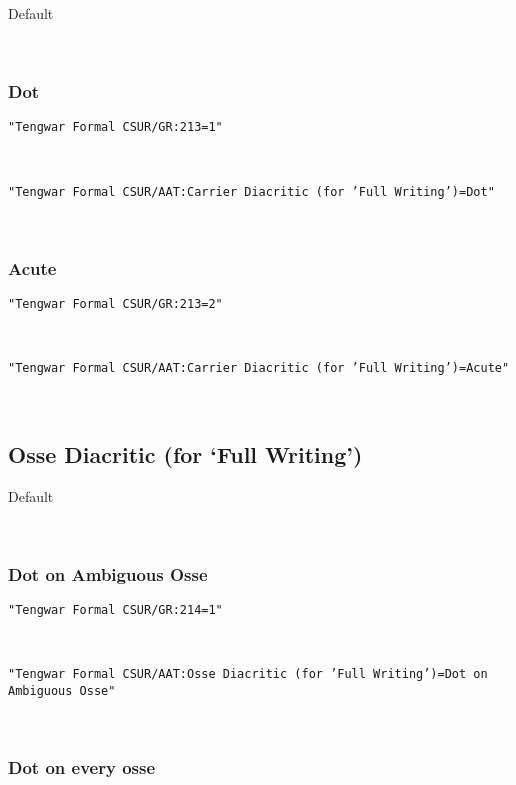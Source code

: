 \documentclass[11pt,a4paper]{article}
\begin{document}
Default

\formalGR  



\subsubsection*{Dot}


\texttt{"Tengwar Formal CSUR/GR:213=1"}

\formalGRcarrierdot  

\noindent \texttt{"Tengwar Formal CSUR/AAT:Carrier Diacritic (for 'Full Writing')=Dot"}

\formalAATcarrierdot   



\subsubsection*{Acute}


\texttt{"Tengwar Formal CSUR/GR:213=2"}

\formalGRcarrieracute  

\noindent \texttt{"Tengwar Formal CSUR/AAT:Carrier Diacritic (for 'Full Writing')=Acute"}

\formalAATcarrieracute   \normalfont



\subsection{Osse Diacritic (for ‘Full Writing’)}


Default

\formalGR  



\subsubsection*{Dot on Ambiguous Osse}


\texttt{"Tengwar Formal CSUR/GR:214=1"}

\formalGRosseambiguous  

\noindent \texttt{"Tengwar Formal CSUR/AAT:Osse Diacritic (for 'Full Writing')=Dot on Ambiguous Osse"}

\formalAATosseambiguous  



\subsubsection*{Dot on every osse}
\end{document}
